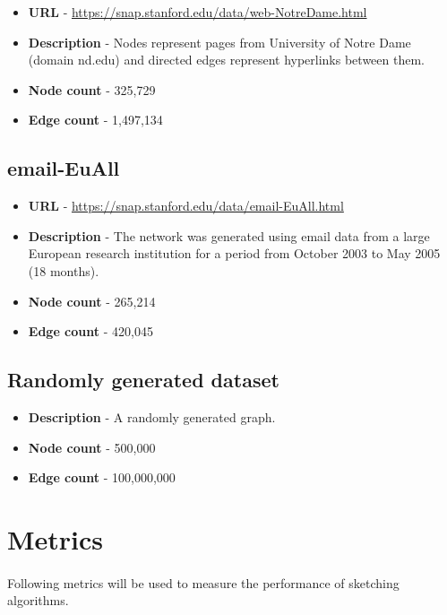 \begin{itemize}
    \item \textbf{URL} - \url{https://snap.stanford.edu/data/web-NotreDame.html}
    \item \textbf{Description} - Nodes represent pages from University of Notre Dame (domain nd.edu) and directed edges represent hyperlinks between them.
    \item \textbf{Node count} - 325,729
    \item \textbf{Edge count} - 1,497,134
\end{itemize}

\subsection{email-EuAll}

\begin{itemize}
    \item \textbf{URL} - \url{https://snap.stanford.edu/data/email-EuAll.html}
    \item \textbf{Description} - The network was generated using email data from a large European research institution for a period from October 2003 to May 2005 (18 months).
    \item \textbf{Node count} - 265,214
    \item \textbf{Edge count} - 420,045
\end{itemize}

\subsection{Randomly generated dataset}

\begin{itemize}
    \item \textbf{Description} - A randomly generated graph.
    \item \textbf{Node count} - 500,000
    \item \textbf{Edge count} - 100,000,000
\end{itemize}

\section{Metrics} \label{metrics}

\paragraph{}
Following metrics will be used to measure the performance of sketching algorithms. 

